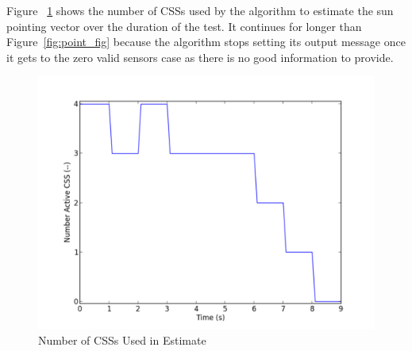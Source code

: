 \documentclass[]{LASPreport}
\begin{document}
Figure ~\ref{fig:num_fig} shows the number of CSSs used by the algorithm to 
estimate the sun pointing vector over the duration of the test.  It continues 
for longer than Figure~\ref{fig:point_fig} because the algorithm stops setting 
its output message once it gets to the zero valid sensors case as there is no 
good information to provide.
\begin{figure}[htb]
        \centerline{
        \includegraphics[scale=0.5]{Figures/numGoodCSS}
        }
        \caption{Number of CSSs Used in Estimate}
        \label{fig:num_fig}
\end{figure}
\end{document}
